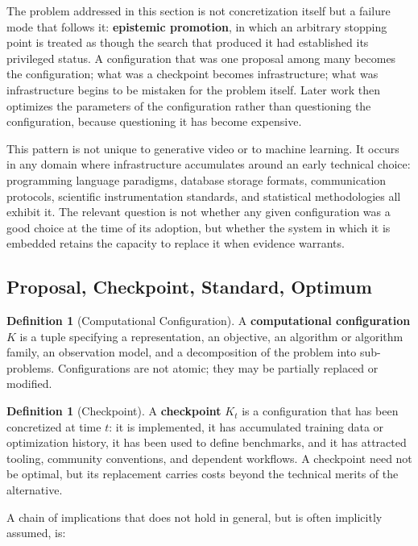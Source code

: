 \documentclass[12pt,a4paper]{article}
\theoremstyle{plain}
\theoremstyle{definition}
\newtheorem{definition}[theorem]{Definition}
\theoremstyle{remark}
\begin{document}
The problem addressed in this section is not concretization itself but a failure mode that follows it: \textbf{epistemic promotion}, in which an arbitrary stopping point is treated as though the search that produced it had established its privileged status. A configuration that was one proposal among many becomes the configuration; what was a checkpoint becomes infrastructure; what was infrastructure begins to be mistaken for the problem itself. Later work then optimizes the parameters of the configuration rather than questioning the configuration, because questioning it has become expensive.

This pattern is not unique to generative video or to machine learning. It occurs in any domain where infrastructure accumulates around an early technical choice: programming language paradigms, database storage formats, communication protocols, scientific instrumentation standards, and statistical methodologies all exhibit it. The relevant question is not whether any given configuration was a good choice at the time of its adoption, but whether the system in which it is embedded retains the capacity to replace it when evidence warrants.

\subsection{Proposal, Checkpoint, Standard, Optimum}

\begin{definition}[Computational Configuration]
A \textbf{computational configuration} $K$ is a tuple specifying a representation, an objective, an algorithm or algorithm family, an observation model, and a decomposition of the problem into sub-problems. Configurations are not atomic; they may be partially replaced or modified.
\end{definition}

\begin{definition}[Checkpoint]
A \textbf{checkpoint} $K_t$ is a configuration that has been concretized at time $t$: it is implemented, it has accumulated training data or optimization history, it has been used to define benchmarks, and it has attracted tooling, community conventions, and dependent workflows. A checkpoint need not be optimal, but its replacement carries costs beyond the technical merits of the alternative.
\end{definition}

A chain of implications that does not hold in general, but is often implicitly assumed, is:
\end{document}
